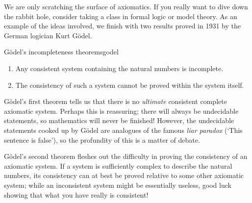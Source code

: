 \vfil


We are only scratching the surface of axiomatics. If you really want to dive down the rabbit hole, consider taking a class in formal logic or model theory. As an example of the ideas involved, we finish with two results proved in 1931 by the German logician Kurt Gödel.


\begin{thm}{Gödel's incompleteness theorems}{godel} 
	\begin{enumerate}
	  \item Any consistent system containing the natural numbers is incomplete.
	  \item The consistency of such a system cannot be proved within the system itself.
	\end{enumerate}
\end{thm}

Gödel's first theorem tells us that there is no \emph{ultimate} consistent complete axiomatic system. Perhaps this is reassuring; there will always be undecidable statements, so mathematics will never be finished! However, the undecidable statements cooked up by Gödel are analogues of the famous \emph{liar paradox} (`This sentence is false'), so the profundity of this is a matter of debate.
\smallbreak

Gödel's second theorem fleshes out the difficulty in proving the consistency of an axiomatic system. If a system is sufficiently complex to describe the natural numbers, its consistency can at best be proved relative to some other axiomatic system; while an inconsistent system might be essentially useless, good luck showing that what you have really is consistent!


\goodbreak



